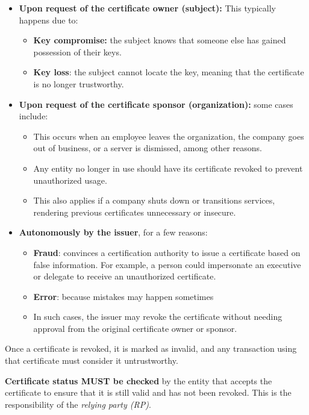 \begin{itemize}
  \item \textbf{Upon request of the certificate owner (subject):}
    This typically happens due to:
    \begin{itemize}
      \item \textbf{Key compromise:} the subject knows that someone else has
        gained possession of their keys.
      \item \textbf{Key loss}: the subject cannot locate the key,
        meaning that the certificate is no longer trustworthy.
    \end{itemize}

  \item \textbf{Upon request of the certificate sponsor
    (organization):} some cases include:
    \begin{itemize}
      \item This occurs when an employee leaves the organization, 
        the company goes out of business, or a server is dismissed,
        among other reasons.
      \item Any entity no longer in use should have its certificate 
    revoked to prevent unauthorized usage.
    \item This also applies if a company shuts down or transitions 
    services, rendering previous certificates unnecessary or insecure.
  \end{itemize}
  
  \item \textbf{Autonomously by the issuer}, for a few reasons:
  \begin{itemize}
    \item \textbf{Fraud}: convinces a certification authority to issue
      a certificate based on false information. For example, a person
      could impersonate an executive or delegate to receive an
      unauthorized certificate.
    \item \textbf{Error}: because mistakes may happen sometimes
    \item In such cases, the issuer may revoke the certificate without 
    needing approval from the original certificate owner or sponsor.
  \end{itemize}
\end{itemize}

Once a certificate is revoked, it is marked as invalid, and any 
transaction using that certificate must consider it untrustworthy.

\textbf{Certificate status MUST be checked} by the entity that 
accepts the certificate to ensure that it is still valid and has 
not been revoked. This is the responsibility of the \emph{relying 
party (RP)}. 

